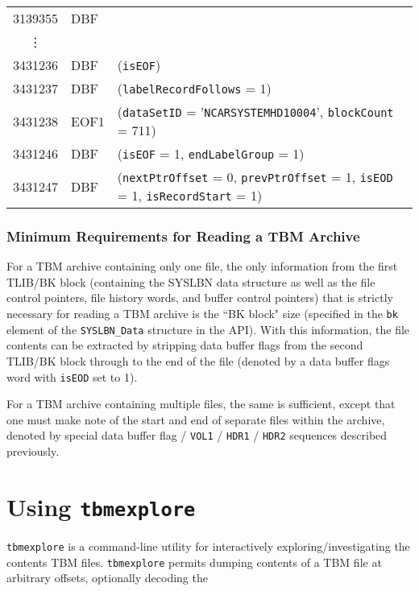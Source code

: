 \documentclass{report}
\begin{document}
\begin{center}
\begin{longtable}{rll}
\hline
3139355 & DBF  & \\
\multicolumn{1}{c}{\vdots} \\
3431236 & DBF  & (\texttt{isEOF}) \\
\hline
3431237 & DBF  & (\texttt{labelRecordFollows} = 1) \\
3431238 & EOF1 & (\texttt{dataSetID} = '\texttt{NCARSYSTEMHD10004}', \texttt{blockCount} = 711) \\
3431246 & DBF  & (\texttt{isEOF} = 1, \texttt{endLabelGroup} = 1) \\
\hline
3431247 & DBF  & (\texttt{nextPtrOffset} = 0, \texttt{prevPtrOffset} = 1, \texttt{isEOD} = 1, \texttt{isRecordStart} = 1) \\
\hline
\end{longtable}
\end{center}

\subsection{Minimum Requirements for Reading a TBM Archive}

For a TBM archive containing only one file, the only information from the first TLIB/BK block (containing the SYSLBN data structure as well as the file control pointers, file history words, and buffer control pointers) that is strictly necessary for reading a TBM archive is the ``BK block" size (specified in the \texttt{bk} element of the \texttt{SYSLBN\_Data} structure in the API). With this information, the file contents can be extracted by stripping data buffer flags from the second TLIB/BK block through to the end of the file (denoted by a data buffer flags word with \texttt{isEOD} set to 1).

For a TBM archive containing multiple files, the same is sufficient, except that one must make note of the start and end of separate files within the archive, denoted by special data buffer flag / \texttt{VOL1} / \texttt{HDR1} / \texttt{HDR2} sequences described previously.

\chapter{Using \texttt{tbmexplore}}

\texttt{tbmexplore} is a command-line utility for interactively exploring/investigating the contents TBM files. \texttt{tbmexplore} permits dumping contents of a TBM file at arbitrary offsets, optionally decoding the 
\end{document}

